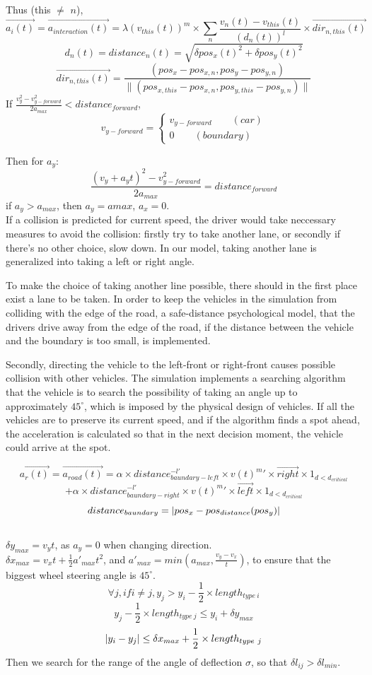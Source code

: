 \documentclass{mcmthesis}
\begin{document}
Thus (this $\ne$ $n$),
$$\overrightarrow{a_i(t)}=\overrightarrow{a_{interaction}(t)}=\lambda (v_{this}(t))^m \times \sum_n\frac{v_n(t)-v_{this}(t)}{(d_n(t))^l}\times \overrightarrow{dir_{n,this}(t)}$$
$$d_{n}(t)=distance_n(t)=\sqrt{\delta pos_x(t)^2+\delta pos_y(t)^2}$$
$$\overrightarrow{dir_{n,this}(t)}=\frac{(pos_x-pos_{x,n},pos_y-pos_{y,n})}{\parallel (pos_{x,this}-pos_{x,n},pos_{y,this}-pos_{y,n}) \parallel} $$
If $\frac{v_y^2-v_{y-forward}^2}{2a_{max}}<distance_{forward}$,
$$v_{y-forward}= \left\{ 
\begin{aligned}
v_{y-forward} \qquad (car)\\
0 \qquad (boundary)
\end{aligned}
\right.
$$

Then for $a_y$:
$$\frac{(v_y+a_yt)^2-v_{y-forward}^2}{2a_{max}}=distance_{forward}$$
if $a_y>a_{max}$, then $a_y=a{max}$, $a_x=0$.\\

If a collision is predicted for current speed, the driver would take neccessary measures to avoid the collision: firstly try to take another lane, or secondly if there's no other choice, slow down. In our model, taking another lane is generalized into taking a left or right angle.

To make the choice of taking another line possible, there should in the first place exist a lane to be taken. In order to keep the vehicles in the simulation from colliding with the edge of the road, a safe-distance psychological model, that the drivers drive away from the edge of the road, if the distance between the vehicle and the boundary is too small, is implemented. 

Secondly, directing the vehicle to the left-front or right-front causes possible collision with other vehicles. The simulation implements a searching algorithm that the vehicle is to search the possibility of taking an angle up to approximately $45^{\circ}$, which is imposed by the physical design of vehicles. If all the vehicles are to preserve its current speed, and if the algorithm finds a spot ahead, the acceleration is calculated so that in the next decision moment, the vehicle could arrive at the spot.

$$\overrightarrow{a_r(t)}=\overrightarrow{a_{road}(t)}=\alpha \times distance_{baundary-left}^{-l'} \times v(t)^m'\times \overrightarrow{right} \times 1_{d<d_{critical}}$$
	$$+\alpha \times distance_{baundary-right}^{-l'} \times v(t)^m'\times \overrightarrow{left} \times 1_{d<d_{critical}}$$
	$$distance_{baundary}=\arrowvert pos_x-pos_{distance}(pos_y) \arrowvert$$\\
 $\delta y_{max}=v_yt$, as $a_y=0$ when changing direction.\\
$\delta x_{max}=v_xt+\frac{1}{2}a'_{max}t^2$, and $a'_{max}=min(a_{max},\frac{v_y-v_x}{t})$, to ensure that the biggest wheel steering angle is $45^{\circ}$.\\
$$\forall j, if i \ne j, y_j>y_i-\frac{1}{2} \times length_{type\ i}$$
$$y_j-\frac{1}{2} \times length_{type\ j} \le y_i+\delta y_{max}$$
$$\arrowvert y_i-y_j \arrowvert \le \delta x_{max}+ \frac{1}{2} \times length_{type\ j}$$
Then we search for the range of the angle of deflection $\sigma$, so that $\delta l_{ij}>\delta l_{min}$.
\end{document}
